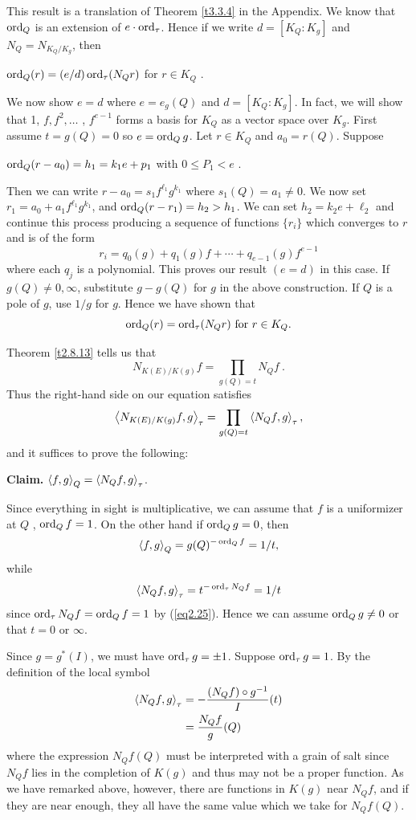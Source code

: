 This result is a translation of Theorem \ref{t3.3.4} in the Appendix. We know that $\operatorname{ord}_{Q}$ is an extension of $e\cdot \operatorname{ord}_{\tau}$. Hence if we write $d=[K_{Q}:K_{g}]$ and $N_{Q}=N_{K_{Q}/K_{g}}$, then
\begin{center}
$\operatorname{ord}_{Q}(r)=(e/d)\operatorname{ord}_{\tau}(N_{Q}r)$ for $r\in K_{Q}$ .
\end{center}
We now show $e=d$ where $e=e_{g}(Q)$ and $d=[K_{Q}:K_{g}]$. In fact, we will show that 1, $f,f^{2},\ldots$ , $f^{e-1}$ forms a basis for $K_{Q}$ as a vector space over $K_{g}$. First assume $t =g(Q)=0$ so $e=\operatorname{ord}_{Q}g$. Let $r\in K_{Q}$ and $a_{0}=r(Q)$. Suppose
\begin{center}
$\operatorname{ord}_{Q}(r-a_{0})=h_{1}=k_{1}e+p_{1}$ with $0\leq P_{1}<e$ .
\end{center}
Then we can write $r-a_{0}=s_{1}f^{\ell_{1}}g^{k_{1}}$ where $s_{1}(Q)=a_{1}\neq 0$. We now set $r_{1}=a_{0}+a_{1}f^{\ell_{1}}g^{k_{1}}$, and $\operatorname{ord}_{Q}(r-r_{1})=h_{2}>h_{1}$. We can set $h_{2}=k_{2}e+\ell_{2}$ and continue this process producing a sequence of functions $\{r_{i}\}$ which converges to $r$ and is of the form
$$
r_{i}=q_{0}(g)+q_{1}(g)f+\cdots+q_{e-1}(g)f^{e-1}
$$
where each $q_{j}$ is a polynomial. This proves our result $(e=d)$ in this case. If $g(Q)\neq 0,\infty$, substitute $g-g(Q)$ for $g$ in the above construction. If $Q$ is a pole of $g$, use $1/g$ for $g$. Hence we have shown that
\begin{equation}
\label{eq2.25}
\operatorname{ord}_{Q}(r)=\operatorname{ord}_{\tau}(N_{Q}r)\text{ for }r\in K_{Q} .
\end{equation}

Theorem \ref{t2.8.13} tells us that
$$
N_{K(E)/K(g)}f=\prod_{g(Q)=t}N_{Q}f\ .
$$
Thus the right-hand side on our equation satisfies
$$
\left\langle N_{K(E)/K(g)}f, g \right \rangle_{\tau}=\prod_{g(Q) = t} \left\langle N_{Q}f, g \right \rangle_{\tau},
$$
and it suffices to prove the following:

\textbf{Claim.} $\left\langle f,g \right \rangle_{Q} = \left\langle N_{Q}f, g \right \rangle_{\tau}$.

Since everything in sight is multiplicative, we can assume that $f$ is a uniformizer at $Q$ \ie, $\operatorname{ord}_{Q}f=1$. On the other hand if $\operatorname{ord}_{Q}g=0$, then
$$
\left\langle f,g \right \rangle_{Q}=g(Q)^{-\operatorname{ord}_{Q}f}=1/t,
$$
while
$$
\left\langle N_{Q}f, g \right \rangle_{\tau} = t^{-\operatorname{ord}_{\tau}N_{Q}f}=1/t
$$
since $\operatorname{ord}_{\tau}N_{Q}f=\operatorname{ord}_{Q}f=1$ by (\ref{eq2.25}). Hence we can assume $\operatorname{ord}_{Q}g\neq 0$ or that $t =0$ or $\infty$.

Since $g=g^{*}(I)$, we must have $\operatorname{ord}_{\tau} g=\pm 1$. Suppose $\operatorname{ord}_{\tau}g=1$. By the definition of the local symbol
\begin{align*}
\left\langle N_{Q}f, g \right \rangle_{\tau} &= -\frac{(N_{Q}f)\circ g^{-1}}{I}(t)\\
&=\frac{N_{Q}f}{g}(Q)
\end{align*}
where the expression $N_{Q}f(Q)$ must be interpreted with a grain of salt since $N_{Q}f$ lies in the completion of $K(g)$ and thus may not be a proper function. As we have remarked above, however, there are functions in $K(g)$ near $N_{Q}f$, and if they are near enough, they all have the same value which we take for $N_{Q}f(Q)$.


